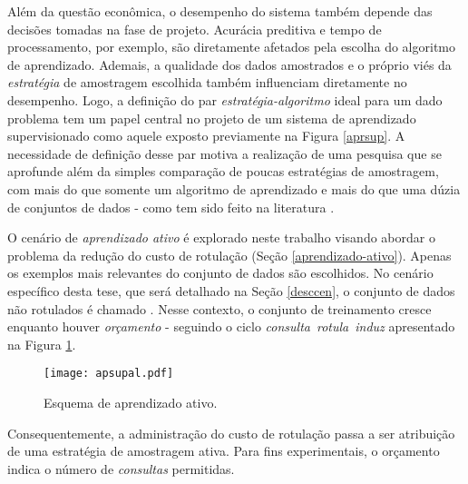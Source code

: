 Além da questão econômica, o desempenho do sistema também depende das decisões tomadas na fase de projeto.
Acurácia preditiva e tempo de processamento, por exemplo, são diretamente afetados pela escolha do algoritmo de aprendizado.
Ademais, a qualidade dos dados amostrados e o próprio viés da \textit{estratégia} de amostragem escolhida também influenciam diretamente no desempenho.
Logo, a definição do par \textit{estratégia-algoritmo} ideal para um dado problema tem um papel central no projeto de um sistema de aprendizado supervisionado como aquele exposto previamente na Figura \ref{aprsup}.
A necessidade de definição desse par motiva a realização de uma pesquisa que se aprofunde além da simples comparação de poucas estratégias de amostragem, com mais do que somente um algoritmo de aprendizado e mais do que uma dúzia de conjuntos de dados - como tem sido feito na literatura \cite{journals/corr/EvansAA14a,conf/emnlp/SettlesC08,journals/ml/ScheinU07,conf/ecml/KornerW06}.

O cenário de \textit{aprendizado ativo} é explorado neste trabalho visando abordar o problema da redução do custo de rotulação (Seção \ref{aprendizado-ativo}).
Apenas os exemplos mais relevantes do conjunto de dados são escolhidos.
No cenário específico desta tese, que será detalhado na Seção \ref{desccen}, o conjunto de dados não rotulados é chamado .
Nesse contexto, o conjunto de treinamento cresce enquanto houver \textit{orçamento} - seguindo o ciclo \mbox{\textit{consulta} \MVRightarrow\phantom{i}\textit{rotula} \MVRightarrow\phantom{i}\textit{induz}} 
apresentado na Figura \ref{apsupal}.
\begin{figure}
  \setlength{\unitlength}{1.0cm}
  \centering
    \texttt{[image: apsupal.pdf]}
  \caption{Esquema de aprendizado ativo.}
  \label{apsupal}
\end{figure}
Consequentemente, a administração do custo de rotulação passa a ser atribuição de uma estratégia de amostragem ativa.
Para fins experimentais, o orçamento indica o número de \textit{consultas} permitidas.

